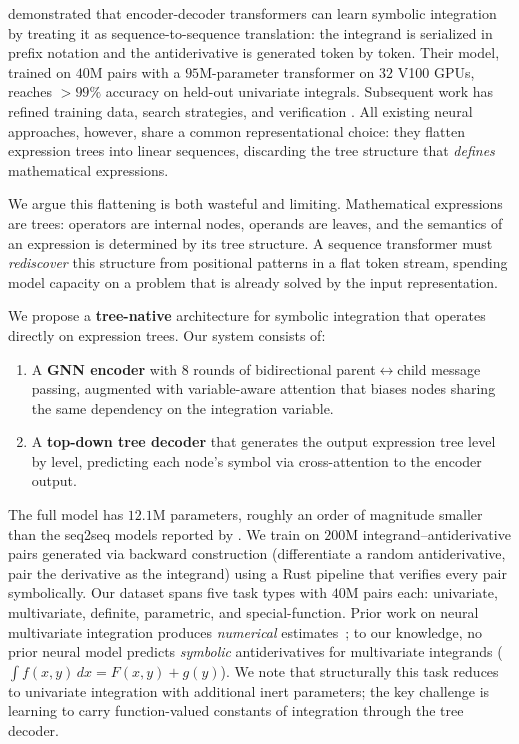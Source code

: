 \documentclass{article}
\begin{document}
\citet{lample2020deep} demonstrated that encoder-decoder transformers can
learn symbolic integration by treating it as sequence-to-sequence
translation: the integrand is serialized in prefix notation and the
antiderivative is generated token by token. Their model, trained on $40$M
pairs with a $95$M-parameter transformer on $32$ V100 GPUs, reaches
$>\!99\%$ accuracy on held-out univariate integrals. Subsequent work has
refined training data, search strategies, and verification
\citep{davis2019use,alphaintegrator2024,sird2023,meidani2024snip}. All existing neural
approaches, however, share a common representational choice: they flatten
expression trees into linear sequences, discarding the tree structure that
\emph{defines} mathematical expressions.

We argue this flattening is both wasteful and limiting. Mathematical
expressions are trees: operators are internal nodes, operands are leaves,
and the semantics of an expression is determined by its tree structure. A
sequence transformer must \emph{rediscover} this structure from positional
patterns in a flat token stream, spending model capacity on a problem that
is already solved by the input representation.

We propose a \textbf{tree-native} architecture for symbolic integration that
operates directly on expression trees. Our system consists of:
\begin{enumerate}
	\item A \textbf{GNN encoder} with $8$ rounds of bidirectional
	      parent$\leftrightarrow$child message passing, augmented with
	      variable-aware attention that biases nodes sharing the same dependency
	      on the integration variable.
	\item A \textbf{top-down tree decoder} that generates the output
	      expression tree level by level, predicting each node's symbol via
	      cross-attention to the encoder output.
\end{enumerate}
The full model has $12.1$M parameters, roughly an order of magnitude smaller
than the seq2seq models reported by \citet{lample2020deep}. We train on
$200$M integrand--antiderivative pairs generated via backward construction
(differentiate a random antiderivative, pair the derivative as the
integrand) using a Rust pipeline that verifies every pair symbolically. Our
dataset spans five task types with $40$M pairs each: univariate,
multivariate, definite, parametric, and special-function. Prior work on neural multivariate integration produces
\emph{numerical} estimates~\citep{rubab2025neural,maitre2023numerical}; to
our knowledge, no prior neural model predicts \emph{symbolic}
antiderivatives for multivariate integrands
($\int f(x,y)\,dx = F(x,y) + g(y)$). We note that structurally this task
reduces to univariate integration with additional inert parameters; the
key challenge is learning to carry function-valued constants of
integration through the tree decoder.
\end{document}
